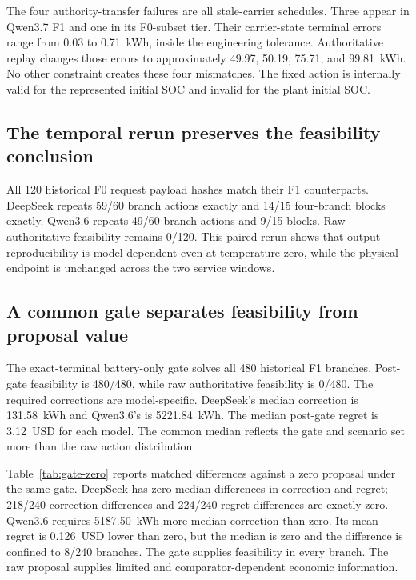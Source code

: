 \documentclass[11pt]{article}
\begin{document}
The four authority-transfer failures are all stale-carrier schedules. Three appear in Qwen3.7 F1
and one in its F0-subset tier. Their carrier-state terminal errors range from 0.03 to 0.71~kWh,
inside the engineering tolerance. Authoritative replay changes those errors to approximately
49.97, 50.19, 75.71, and 99.81~kWh. No other constraint creates these four mismatches. The fixed
action is internally valid for the represented initial SOC and invalid for the plant initial SOC.

\subsection{The temporal rerun preserves the feasibility conclusion}

All 120 historical F0 request payload hashes match their F1 counterparts. DeepSeek repeats 59/60
branch actions exactly and 14/15 four-branch blocks exactly. Qwen3.6 repeats 49/60 branch actions
and 9/15 blocks. Raw authoritative feasibility remains 0/120. This paired rerun shows that output
reproducibility is model-dependent even at temperature zero, while the physical endpoint is
unchanged across the two service windows.

\subsection{A common gate separates feasibility from proposal value}

The exact-terminal battery-only gate solves all 480 historical F1 branches. Post-gate feasibility
is 480/480, while raw authoritative feasibility is 0/480. The required corrections
are model-specific. DeepSeek's median correction is 131.58~kWh and Qwen3.6's is 5221.84~kWh. The
median post-gate regret is 3.12~USD for each model. The common median reflects the gate and scenario
set more than the raw action distribution.

Table~\ref{tab:gate-zero} reports matched differences against a zero proposal under the same gate.
DeepSeek has zero median differences in correction and regret; 218/240 correction differences and
224/240 regret differences are exactly zero. Qwen3.6 requires 5187.50~kWh more median correction
than zero. Its mean regret is 0.126~USD lower than zero, but the median is zero and the difference
is confined to 8/240 branches. The gate supplies feasibility in every branch. The raw proposal
supplies limited and comparator-dependent economic information.
\end{document}
